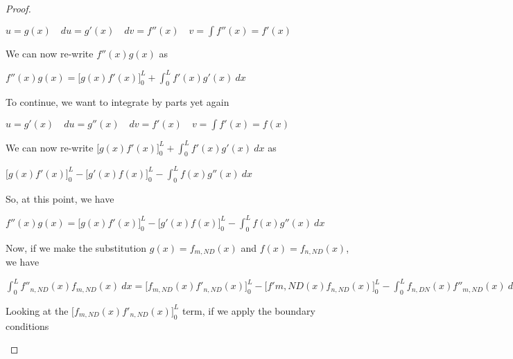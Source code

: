 \documentclass[executivepaper]{article}
\begin{document}
\begin{flushleft}
\begin{proof}
\begin{center}
$u=g(x) \quad du=g'(x) \quad dv=f''(x) \quad v=\int f''(x)=f'(x)$

\end{center}

We can now re-write $f''(x)g(x)$ as

\begin{center}

$f''(x)g(x)=\bigg[g(x)f'(x)\bigg]_{0}^{L} + \int_{0}^{L} f'(x)g'(x) \ dx$

\end{center}

To continue, we want to integrate by parts yet again

\begin{center}

$u=g'(x) \quad du=g''(x) \quad dv=f'(x) \quad v=\int f'(x)=f(x)$

\end{center}

We can now re-write $\bigg[g(x)f'(x)\bigg]_{0}^{L} + \int_{0}^{L} f'(x)g'(x) \ dx$ as

\begin{center}

$\bigg[g(x)f'(x)\bigg]_{0}^{L} - \bigg[g'(x)f(x)\bigg]_{0}^{L} - \int_{0}^{L} f(x)g''(x) \ dx$

\end{center}

So, at this point, we have

\begin{center}

$f''(x)g(x)=\bigg[g(x)f'(x)\bigg]_{0}^{L} - \bigg[g'(x)f(x)\bigg]_{0}^{L} - \int_{0}^{L} f(x)g''(x) \ dx$

\end{center}

Now, if we make the substitution $g(x)=f_{m,ND}(x)$ and $f(x)=f_{n,ND}(x)$, we have

\begin{center}

$\int_{0}^{L} f''_{n, ND}(x)f_{m, ND}(x) \ dx=\bigg[f_{m, ND}(x)f'_{n, ND}(x)\bigg]_{0}^{L} - \bigg[f'{m, ND}(x)f_{n, ND}(x)\bigg]_{0}^{L} - \int_{0}^{L} f_{n, DN}(x)f''_{m, ND}(x) \ dx$

\end{center}

Looking at the $\bigg[f_{m, ND}(x)f'_{n, ND}(x)\bigg]_{0}^{L}$ term, if we apply the boundary conditions

\begin{center}


\end{center}
\end{proof}
\end{flushleft}
\end{document}
